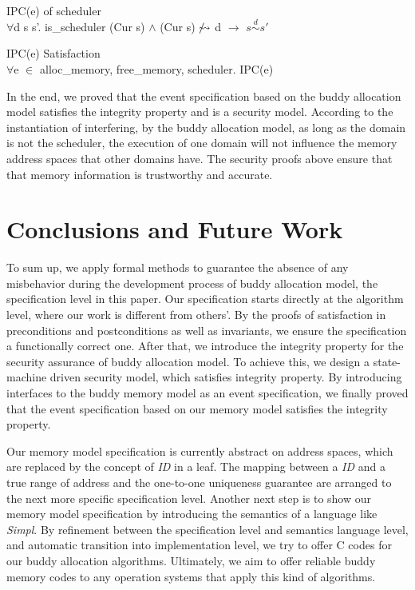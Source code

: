 \documentclass[runningheads]{llncs}
\makeatletter
\newcommand{\equidom}[3]{{#1}\stackrel{#2}{\sim}{#3}}
\newcommand{\superimpose}[2]
	{{\ooalign{$#1\@firstoftwo#2$\cr\hfil$#1\@secondoftwo#2$\hfil\cr}}}
\newcommand{\ninterf}{\mathrel{\mathpalette\superimpose{{\slash}{\leadsto}}}}
\makeatother
\begin{document}
\begin{lemma} {IPC(e) of scheduler} \\
$\forall$d s s'. is\_scheduler (Cur s) $\wedge$ (Cur s) $\ninterf$ d $\longrightarrow$ $\equidom{s}{d}{s'}$
\end{lemma}

\begin{theorem} {IPC(e) Satisfaction} \\
$\forall$e $\in$ {alloc\_memory, free\_memory, scheduler}. IPC(e)
\end{theorem}

In the end, we proved that the event specification based on the buddy allocation model satisfies the integrity property and is a security model. According to the instantiation of interfering, by the buddy allocation model, as long as the domain is not the scheduler, the execution of one domain will not influence the memory address spaces that other domains have. The security proofs above ensure that that memory information is trustworthy and accurate.

\section{Conclusions and Future Work}
To sum up, we apply formal methods to guarantee the absence of any misbehavior during the development process of buddy allocation model, the specification level in this paper. Our specification starts directly at the algorithm level, where our work is different from others'. By the proofs of satisfaction in preconditions and postconditions as well as invariants, we ensure the specification a functionally correct one. After that, we introduce the integrity property for the security assurance of buddy allocation model. To achieve this, we design a state-machine driven security model, which satisfies integrity property. By introducing interfaces to the buddy memory model as an event specification, we finally proved that the event specification based on our memory model satisfies the integrity property.

Our memory model specification is currently abstract on address spaces, which are replaced by the concept of \textsl{ID} in a leaf. The mapping between a \textsl{ID} and a true range of address and the one-to-one uniqueness guarantee are arranged to the next more specific specification level. Another next step is to show our memory model specification by introducing the semantics of a language like \textsl{Simpl}. By refinement between the specification level and semantics language level, and automatic transition into implementation level, we try to offer C codes for our buddy allocation algorithms. Ultimately, we aim to offer reliable buddy memory codes to any operation systems that apply this kind of algorithms.
\end{document}
